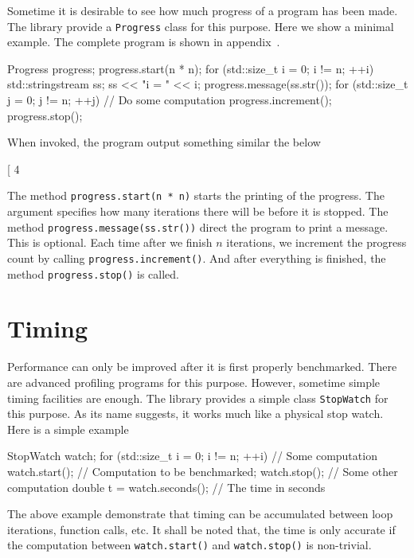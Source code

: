 Sometime it is desirable to see how much progress of a program has been made.
The library provide a \verb|Progress| class for this purpose. Here we show a
minimal example. The complete program is shown in
appendix~.
\begin{cppcode}
  Progress progress;
  progress.start(n * n);
  for (std::size_t i = 0; i != n; ++i) {
      std::stringstream ss;
      ss << "i = " << i;
      progress.message(ss.str());
      for (std::size_t j = 0; j != n; ++j) {
          // Do some computation
          progress.increment();
      }
  }
  progress.stop();
\end{cppcode}
When invoked, the program output something similar the below
\begin{textcode}
  [  4%
\end{textcode}
The method \verb|progress.start(n * n)| starts the printing of the progress.
The argument specifies how many iterations there will be before it is stopped.
The method \verb|progress.message(ss.str())| direct the program to print a
message. This is optional. Each time after we finish $n$ iterations, we
increment the progress count by calling \verb|progress.increment()|. And after
everything is finished, the method \verb|progress.stop()| is called.

\section{Timing}
\label{sec:Timing}

Performance can only be improved after it is first properly benchmarked. There
are advanced profiling programs for this purpose. However, sometime simple
timing facilities are enough. The library provides a simple class
\verb|StopWatch| for this purpose. As its name suggests, it works much like a
physical stop watch. Here is a simple example
\begin{cppcode}
  StopWatch watch;
  for (std::size_t i = 0; i != n; ++i) {
      // Some computation
      watch.start();
      // Computation to be benchmarked;
      watch.stop();
      // Some other computation
  }
  double t = watch.seconds(); // The time in seconds
\end{cppcode}
The above example demonstrate that timing can be accumulated between loop
iterations, function calls, etc. It shall be noted that, the time is only
accurate if the computation between \verb|watch.start()| and
\verb|watch.stop()| is non-trivial.
